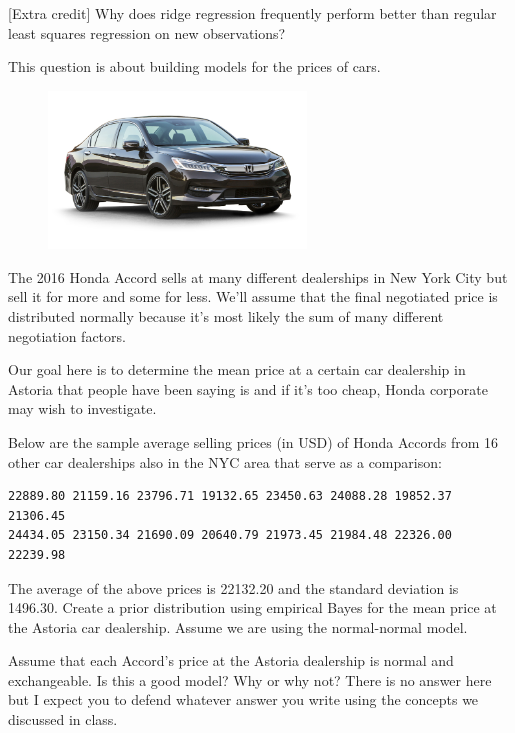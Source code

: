 \documentclass[12pt]{article}
\begin{document}
 [Extra credit] Why does ridge regression frequently perform better than regular least squares regression on new observations?

\eenum

\problem This question is about building models for the prices of cars.

\begin{figure}[htp]
\centering
\includegraphics[width=2.7in]{accord.jpg}
\end{figure}

The 2016 Honda Accord sells at many different dealerships in New York City but sell it for more and some for less. We'll assume that the final negotiated price is distributed normally because it's most likely the sum of many different negotiation factors.

Our goal here is to determine the mean price at a certain car dealership in Astoria that people have been saying is  and if it's too cheap, Honda corporate may wish to investigate.

Below are the sample average selling prices (in USD) of Honda Accords from 16 other car dealerships also in the NYC area that serve as a comparison:

\begin{verbatim}
22889.80 21159.16 23796.71 19132.65 23450.63 24088.28 19852.37 21306.45
24434.05 23150.34 21690.09 20640.79 21973.45 21984.48 22326.00 22239.98
\end{verbatim}

\benum

 The average of the above prices is 22132.20 and the standard deviation is 1496.30. Create a prior distribution using empirical Bayes for the mean price at the Astoria car dealership. Assume we are using the normal-normal model. 

 Assume that each Accord's price at the Astoria dealership is normal and exchangeable. Is this a good model? Why or why not? There is no  answer here but I expect you to defend whatever answer you write using the concepts we discussed in class. 
\end{document}
